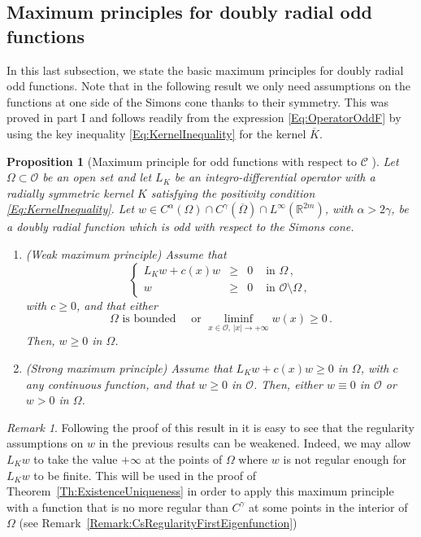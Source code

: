 \documentclass[12pt,reqno]{amsart}
\newtheorem{proposition}[theorem]{Proposition}
\theoremstyle{definition}
\theoremstyle{remark}
\newtheorem{remark}[theorem]{Remark}
\newcommand{\con}[1]{\mathbb{#1}}
\newcommand{\R}{\con{R}} %
\newcommand{\ccal}{\mathscr{C}}
\newcommand{\ocal}{\mathcal{O}}
\newcommand{\s}{\gamma}
\newcommand\beqc[1]{\left\{\begin{array}{#1}}
\newcommand\eeqc{\end{array} \right.}
\def\PDEsystem{rcll}
\numberwithin{equation}{section}
\begin{document}
\subsection{Maximum principles for doubly radial odd functions}
\label{Subsec:MaxPrinciples}

In this last subsection, we state the basic maximum principles for doubly radial odd functions. Note that in the following result we only need assumptions on the functions at one side of the Simons cone thanks to their symmetry. This was proved in part I \cite{FelipeSanz-Perela:IntegroDifferentialI} and follows readily from the expression \eqref{Eq:OperatorOddF} by using the key inequality \eqref{Eq:KernelInequality} for the kernel $\overline{K}$.

\begin{proposition}[Maximum principle for odd functions with respect to $\ccal$ \cite{FelipeSanz-Perela:IntegroDifferentialI}]
	\label{Prop:MaximumPrincipleForOddFunctions} Let $\Omega \subset \ocal$ be an open set and let $L_K$ be an integro-differential operator with a radially symmetric kernel $K$ satisfying the positivity condition \eqref{Eq:KernelInequality}.  Let $w\in C^{\alpha}(\Omega)\cap C^{\s}(\overline{\Omega})\cap L^\infty(\R^{2m})$, with $\alpha > 2\s$, be a doubly radial function which is odd with respect to the Simons cone. 
	
	\begin{enumerate}[label=(\roman{*})]
		\item  (Weak maximum principle)
		Assume that
		$$
		\beqc{\PDEsystem}
		L_K w + c(x) w & \geq & 0 & \text{ in } \Omega\,,\\
		w & \geq & 0 & \text{ in } \ocal \setminus \Omega\,,
		\eeqc
		$$
		with $c \geq 0$, and that either
		$$
		\Omega \text{ is bounded} \quad \text{ or } \liminf_{x \in \ocal,\,|x|\to +\infty} w(x) \geq 0\,.
		$$
		Then, $w \geq 0$ in $\Omega$.
		
		\item (Strong maximum principle)  
		Assume that $L_K w + c(x) w\geq 0$ in $\Omega$, with $c$ any continuous function, and that $w\geq 0$ in $\ocal$. Then, either $w\equiv 0$ in $\ocal$ or $w > 0$ in $\Omega$.
	\end{enumerate} 
\end{proposition}

\begin{remark}
	\label{Remark:MaxPrincipleSingularity}
	Following the proof of this result in \cite{FelipeSanz-Perela:IntegroDifferentialI} it is easy to see that the regularity assumptions on $w$ in the previous results can be weakened. Indeed, we may allow $L_K w$ to take the value $+\infty$ at the points of $\Omega$ where $w$ is not regular enough for $L_K w$ to be finite. This will be used in the proof of Theorem~\ref{Th:ExistenceUniqueness} in order to apply this maximum principle with a function that is no more regular than $C^\s$ at some points in the interior of $\Omega$ (see Remark~\ref{Remark:CsRegularityFirstEigenfunction}) 	
\end{remark}
\end{document}
